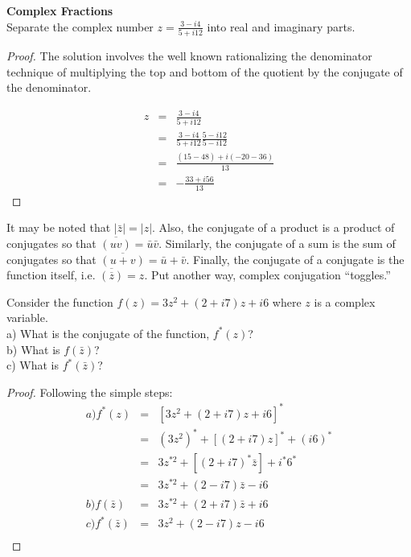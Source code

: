 \begin{example}
\textbf{Complex Fractions}\\
Separate the complex number $z = \frac {3-i4}{5+i12}$
into real and imaginary parts.
\end{example}
\begin{proof}
The solution involves the well known rationalizing 
the denominator technique of multiplying the top and bottom of the quotient 
by the conjugate of the denominator.

\begin{eqnarray*}
z &=& \frac {3-i4}{5+i12} \\
  &=& \frac {3-i4}{5+i12} \frac {5-i12}{5-i12}  \\
  &=& \frac {(15-48)+i(-20-36)}{13} \\
  &=& - \frac {33+i56}{13} 
\end{eqnarray*}
\end{proof}
It may be noted that $|\bar{z}| = |z|$.  Also, the conjugate of a product 
is a product of conjugates so that $\overline{(uv)} = \bar{u} \bar{v}$.  Similarly, 
the conjugate of a sum is the sum of conjugates so that 
$\overline{(u + v)} = \bar{u} + \bar{v}$.
Finally, the conjugate of a conjugate is the function itself, i.e.
$\overline{(\overline{z})} = z$.  Put another way, complex conjugation ``toggles.''

\begin{example}
Consider the function $f(z) = 3z^2 +(2+i7)z + i6$ where $z$ is 
a complex variable. \\
\indent
a)      What is the conjugate of  the function, $f^*(z)$? \\
\indent
b)      What is $f(\bar{z})$? \\
\indent
c)      What is $f^*(\bar{z})$? \\
\end{example}

\begin{proof}
Following the simple steps:
\begin{eqnarray*}
a)  f^*(z) &=& [3z^2 + (2+i7)z + i6]^* \\
           &=& (3z^2)^* + [(2+i7)z]^* + (i6)^* \\
           &=& 3z^{*2} +[(2+i7)^*\bar{z}] +i^*6^* \\
           &=& 3z^{*2} + (2-i7)\bar{z} - i6 \\
b)  f(\bar{z}) &=& 3z^{*2} +(2+i7)\bar{z} + i6 \\ 
c)  f^*(\bar{z}) &=& 3z^2 + (2-i7)z - i6 \\
\end{eqnarray*}
\end{proof}


